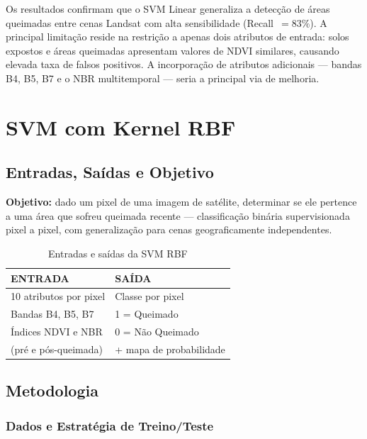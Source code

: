 \documentclass[conference]{IEEEtran}
\begin{document}
Os resultados confirmam que o SVM Linear generaliza a detecção de áreas
queimadas entre cenas Landsat com alta sensibilidade (Recall~$= 83\%$).
A principal limitação reside na restrição a apenas dois atributos de
entrada: solos expostos e áreas queimadas apresentam valores de NDVI
similares, causando elevada taxa de falsos positivos. A incorporação de
atributos adicionais — bandas B4, B5, B7 e o NBR multitemporal — seria
a principal via de melhoria.

\section{SVM com Kernel RBF}

\subsection{Entradas, Saídas e Objetivo}

\textbf{Objetivo:} dado um pixel de uma imagem de satélite, determinar se
ele pertence a uma área que sofreu queimada recente — classificação binária
supervisionada pixel a pixel, com generalização para cenas geograficamente
independentes.

\begin{table}[!t]
  \caption{Entradas e saídas da SVM RBF}
  \label{tab:svm_rbf_io}
  \centering
  \begin{tabular}{ll}
    \toprule
    \textbf{ENTRADA} & \textbf{SAÍDA} \\
    \midrule
    10 atributos por pixel & Classe por pixel \\
    Bandas B4, B5, B7 & 1 = Queimado \\
    Índices NDVI e NBR & 0 = Não Queimado \\
    (pré e pós-queimada) & + mapa de probabilidade \\
    \bottomrule
  \end{tabular}
\end{table}

\subsection{Metodologia}

\subsubsection{Dados e Estratégia de Treino/Teste}
\end{document}
